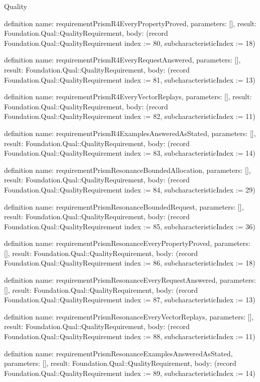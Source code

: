 \begin{lexlean}{Quality}
\begin{semanticmodule}
definition{
  name: requirementPrismR4EveryPropertyProved,
  parameters: [],
  result: Foundation.Qual::QualityRequirement,
  body: (record Foundation.Qual::QualityRequirement {index := 80, subcharacteristicIndex := 18})
}

definition{
  name: requirementPrismR4EveryRequestAnswered,
  parameters: [],
  result: Foundation.Qual::QualityRequirement,
  body: (record Foundation.Qual::QualityRequirement {index := 81, subcharacteristicIndex := 13})
}

definition{
  name: requirementPrismR4EveryVectorReplays,
  parameters: [],
  result: Foundation.Qual::QualityRequirement,
  body: (record Foundation.Qual::QualityRequirement {index := 82, subcharacteristicIndex := 11})
}

definition{
  name: requirementPrismR4ExamplesAnsweredAsStated,
  parameters: [],
  result: Foundation.Qual::QualityRequirement,
  body: (record Foundation.Qual::QualityRequirement {index := 83, subcharacteristicIndex := 14})
}

definition{
  name: requirementPrismResonanceBoundedAllocation,
  parameters: [],
  result: Foundation.Qual::QualityRequirement,
  body: (record Foundation.Qual::QualityRequirement {index := 84, subcharacteristicIndex := 29})
}

definition{
  name: requirementPrismResonanceBoundedRequest,
  parameters: [],
  result: Foundation.Qual::QualityRequirement,
  body: (record Foundation.Qual::QualityRequirement {index := 85, subcharacteristicIndex := 36})
}

definition{
  name: requirementPrismResonanceEveryPropertyProved,
  parameters: [],
  result: Foundation.Qual::QualityRequirement,
  body: (record Foundation.Qual::QualityRequirement {index := 86, subcharacteristicIndex := 18})
}

definition{
  name: requirementPrismResonanceEveryRequestAnswered,
  parameters: [],
  result: Foundation.Qual::QualityRequirement,
  body: (record Foundation.Qual::QualityRequirement {index := 87, subcharacteristicIndex := 13})
}

definition{
  name: requirementPrismResonanceEveryVectorReplays,
  parameters: [],
  result: Foundation.Qual::QualityRequirement,
  body: (record Foundation.Qual::QualityRequirement {index := 88, subcharacteristicIndex := 11})
}

definition{
  name: requirementPrismResonanceExamplesAnsweredAsStated,
  parameters: [],
  result: Foundation.Qual::QualityRequirement,
  body: (record Foundation.Qual::QualityRequirement {index := 89, subcharacteristicIndex := 14})
}


\end{semanticmodule}
\end{lexlean}
